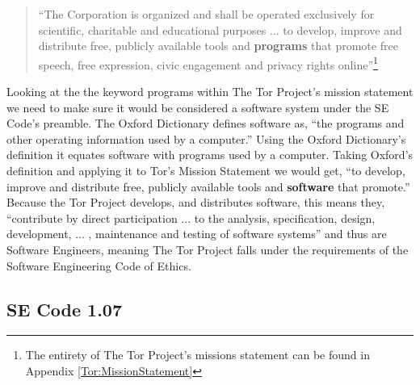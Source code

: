 \documentclass[11pt]{article}
\begin{document}
\begin{multicols}{2}
\begin{quotation}
  ``The Corporation is organized and shall be operated exclusively for scientific,
  charitable and educational purposes ... to develop, improve and distribute
  free, publicly available tools and \textbf{programs} that promote free speech, free
expression, civic engagement and privacy rights online''\footnote{ The entirety
of The Tor Project's missions statement can be found in Appendix
\ref{Tor:MissionStatement}} \cite{TOR:Sponsorship} 
\end{quotation}

Looking at the the keyword programs within The Tor Project's mission statement
we need to make sure it would be considered a software system under the SE
Code's preamble. The Oxford Dictionary defines software as, ``the programs and other operating
information used by a computer.''\cite{defn:Software} Using the Oxford
Dictionary's definition it equates software with programs used by a computer.
Taking Oxford's definition and applying it to Tor's Mission Statement we would
get, ``to develop, improve and distribute free, publicly available tools and
\textbf{software} that promote.''
Because the Tor Project develops, and distributes software, this means they, ``contribute by
direct participation ...  to the analysis, specification, design, development,
... , maintenance and testing of software systems'' and thus are Software
Engineers, meaning The Tor Project falls under the requirements of the Software
Engineering Code of Ethics.\cite{Tor:FAQ, Tor:Overview} 


\subsection{SE Code 1.07} 


\end{multicols}
\end{document}
